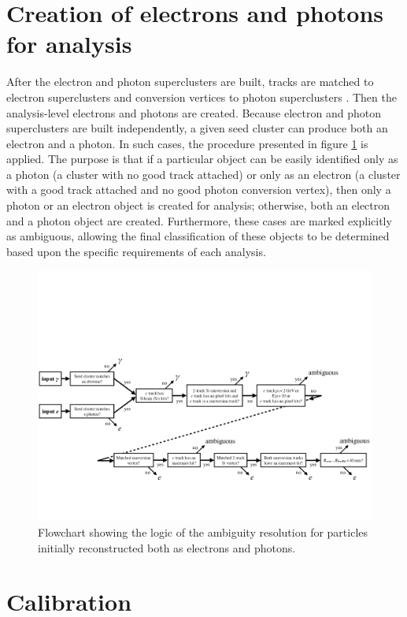 \documentclass[a4paper, oneside]{book}
\begin{document}
		\section{Creation of electrons and photons for analysis}\label{section:creation}
		After the electron and photon superclusters are built, tracks are matched to electron superclusters and conversion vertices to photon superclusters \cite{El ph reco}. Then the analysis-level electrons and photons are created. Because electron and photon superclusters are built independently, a given seed cluster can produce both an electron and a photon. In such cases, the procedure presented in figure \ref{fig:el_ph_analisi} is applied. The purpose is that if a particular object can be easily identified only as a photon (a cluster with no good track attached) or only as an electron (a cluster with a good track attached and no good photon conversion vertex), then only a photon or an electron object is created for analysis; otherwise, both an electron and a photon object are created. Furthermore, these cases are marked explicitly as ambiguous, allowing the final classification of these objects to be determined based upon the specific requirements of each analysis.
		\begin{figure}
			\centering
			\includegraphics[width=.7\textheight]{tesi_images/el_ph_analisi.png}
			\caption{Flowchart showing the logic of the ambiguity resolution for particles initially reconstructed both as electrons and photons.}
			\label{fig:el_ph_analisi}
		\end{figure}
		\section{Calibration}\label{section:Calib}
		
\end{document}
